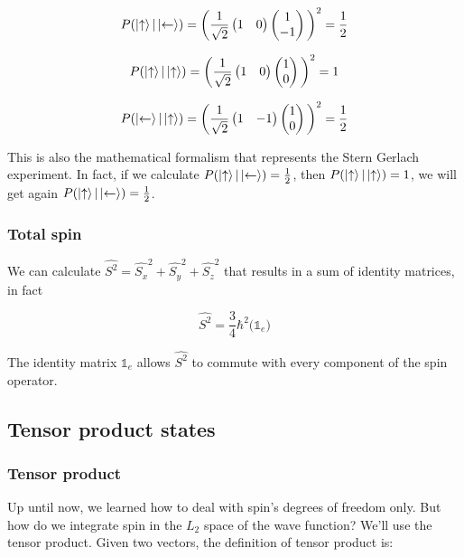 		$$P(\ket{\uparrow}|\ket{\leftarrow})=\bigg(\frac{1}{\sqrt{2}}\begin{pmatrix}1&0\end{pmatrix}\begin{pmatrix}1\\-1\end{pmatrix}\bigg)^2=\frac{1}{2}$$

		$$P(\ket{\uparrow}|\ket{\uparrow})=\bigg(\frac{1}{\sqrt{2}}\begin{pmatrix}1&0\end{pmatrix}\begin{pmatrix}1\\0\end{pmatrix}\bigg)^2=1$$

		$$P(\ket{\leftarrow}|\ket{\uparrow})=\bigg(\frac{1}{\sqrt{2}}\begin{pmatrix}1&-1\end{pmatrix}\begin{pmatrix}1\\0\end{pmatrix}\bigg)^2=\frac{1}{2}$$

		This is also the mathematical formalism that represents the Stern Gerlach experiment.
		In fact, if we calculate $P(\ket{\uparrow}|\ket{\leftarrow}) = \frac{1}{2}$, then $P(\ket{\uparrow}|\ket{\uparrow}) = 1$, we will get again $P(\ket{\uparrow}|\ket{\leftarrow}) = \frac{1}{2}$.

		\subsubsection{Total spin}
		We can calculate $\hat{S^2} = \hat{S_x}^2+\hat{S_y}^2+\hat{S_z}^2$ that results in a sum of identity matrices, in fact

			$$\hat{S^2}=\frac{3}{4}\hbar^2\big(\mathds{1}_e\big)$$

		The identity matrix $\mathds{1}_e$ allows $\hat{S^2}$ to commute with every component of the spin operator.

	\subsection{Tensor product states}


		\subsubsection{Tensor product}
		Up until now, we learned how to deal with spin's degrees of freedom only.
		But how do we integrate spin in the $L_2$ space of the wave function? We'll use the tensor product.
		Given two vectors, the definition of tensor product is:


